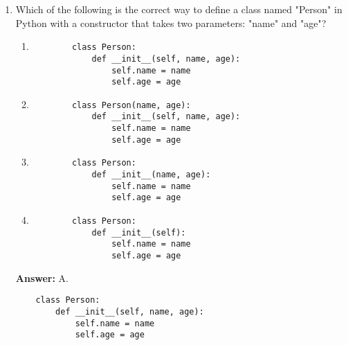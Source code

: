 \documentclass{article}
\begin{document}
\begin{enumerate}
    \item Which of the following is the correct way to define a class named "Person" in Python with a constructor that takes two parameters: "name" and "age"?
    \begin{enumerate}
        \item 
        \begin{verbatim}
        class Person:
            def __init__(self, name, age):
                self.name = name
                self.age = age
        \end{verbatim}
        \item 
        \begin{verbatim}
        class Person(name, age):
            def __init__(self, name, age):
                self.name = name
                self.age = age
        \end{verbatim}
        \item 
        \begin{verbatim}
        class Person:
            def __init__(name, age):
                self.name = name
                self.age = age
        \end{verbatim}
        \item 
        \begin{verbatim}
        class Person:
            def __init__(self):
                self.name = name
                self.age = age
        \end{verbatim}
    \end{enumerate}
    \textbf{Answer:} A. 
    \begin{verbatim}
    class Person:
        def __init__(self, name, age):
            self.name = name
            self.age = age
    \end{verbatim}
\end{enumerate}
\end{document}
